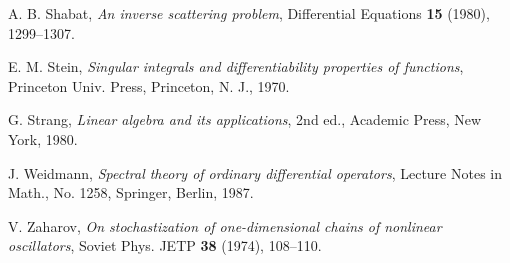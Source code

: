 \documentclass{surv-l}
\theoremstyle{plain}
\theoremstyle{definition}
\numberwithin{equation}{chapter}
\begin{document}
\begin{thebibliography}{AKNS}
 A. B. Shabat, \emph{An inverse scattering problem}, Differential Equations \textbf{15} (1980), 1299--1307.

 E. M. Stein, \emph{Singular integrals and differentiability properties of functions}, Princeton Univ. Press, Princeton, N. J., 1970.

 G. Strang, \emph{Linear algebra and its applications}, 2nd ed., Academic Press, New York, 1980.

 J. Weidmann, \emph{Spectral theory of ordinary differential operators}, Lecture Notes in Math., No. 1258, Springer, Berlin, 1987.

 V. Zaharov, \emph{On stochastization of one-dimensional chains of nonlinear oscillators}, Soviet Phys. JETP \textbf{38} (1974), 108--110.
\end{thebibliography}


\end{document}
